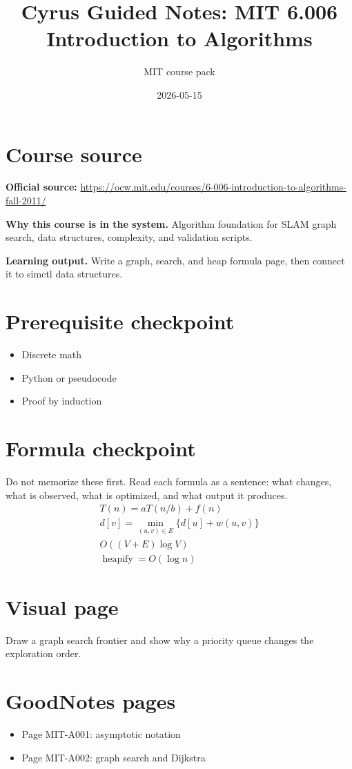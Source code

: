 \documentclass[11pt]{article}
\title{Cyrus Guided Notes: MIT 6.006 Introduction to Algorithms}
\author{MIT course pack}
\date{2026-05-15}
\begin{document}
\maketitle

\section*{Course source}
\textbf{Official source:} \url{https://ocw.mit.edu/courses/6-006-introduction-to-algorithms-fall-2011/}

\textbf{Why this course is in the system.} Algorithm foundation for SLAM graph search, data structures, complexity, and validation scripts.

\textbf{Learning output.} Write a graph, search, and heap formula page, then connect it to simctl data structures.

\section*{Prerequisite checkpoint}
\begin{itemize}[leftmargin=1.4em]
  \item Discrete math
  \item Python or pseudocode
  \item Proof by induction
\end{itemize}

\section*{Formula checkpoint}
Do not memorize these first. Read each formula as a sentence: what changes, what is observed, what is optimized, and what output it produces.
\begin{align*}
  T(n)=aT(n/b)+f(n)\\
  d[v]=\min_{(u,v)\in E}\{d[u]+w(u,v)\}\\
  O((V+E)\log V)\\
  \operatorname{heapify}=O(\log n)
\end{align*}

\section*{Visual page}
Draw a graph search frontier and show why a priority queue changes the exploration order.

\section*{GoodNotes pages}
\begin{itemize}[leftmargin=1.4em]
  \item Page MIT-A001: asymptotic notation
  \item Page MIT-A002: graph search and Dijkstra
\end{itemize}
\end{document}
